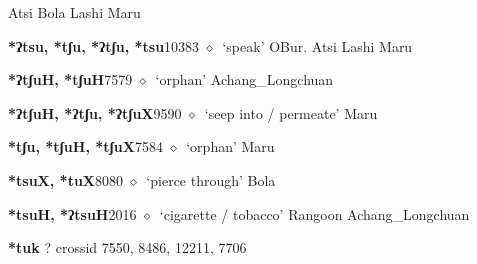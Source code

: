 \begin{list}{}{\leftmargin=1.5em \itemindent=-1.5em}
\hspace{1ex}
         Atsi 
\hspace{1ex}
         Bola 
\hspace{1ex}
         Lashi 
\hspace{1ex}
         Maru 
  \item {\footnotesize \textbf{*ʔtsu, *tʃu, *ʔtʃu, *tsu}}{\tiny 10383}
\hspace{1ex}
         $\diamond$~`speak'
         OBur. 
\hspace{1ex}
         Atsi 
\hspace{1ex}
         Lashi 
\hspace{1ex}
         Maru 
  \item {\footnotesize \textbf{*ʔtʃuH, *tʃuH}}{\tiny 7579}
\hspace{1ex}
         $\diamond$~`orphan'
         Achang\_Longchuan 
  \item {\footnotesize \textbf{*ʔtʃuH, *ʔtʃu, *ʔtʃuX}}{\tiny 9590}
\hspace{1ex}
         $\diamond$~`seep into / permeate'
         Maru 
  \item {\footnotesize \textbf{*tʃu, *tʃuH, *tʃuX}}{\tiny 7584}
\hspace{1ex}
         $\diamond$~`orphan'
         Maru 
  \item {\footnotesize \textbf{*tsuX, *tuX}}{\tiny 8080}
\hspace{1ex}
         $\diamond$~`pierce through'
         Bola 
  \item {\footnotesize \textbf{*tsuH, *ʔtsuH}}{\tiny 2016}
\hspace{1ex}
         $\diamond$~`cigarette / tobacco'
         Rangoon 
\hspace{1ex}
         Achang\_Longchuan 
  \end{list}
\item
\textbf{*tuk}
?
  {\tiny crossid 7550, 8486, 12211, 7706}
